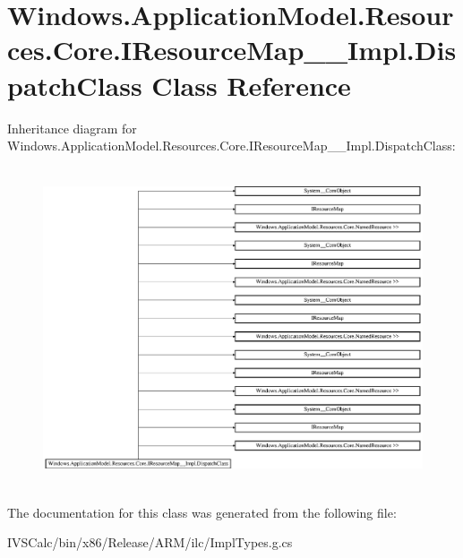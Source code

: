 \hypertarget{class_windows_1_1_application_model_1_1_resources_1_1_core_1_1_i_resource_map_____impl_1_1_dispatch_class}{}\section{Windows.\+Application\+Model.\+Resources.\+Core.\+I\+Resource\+Map\+\_\+\+\_\+\+Impl.\+Dispatch\+Class Class Reference}
\label{class_windows_1_1_application_model_1_1_resources_1_1_core_1_1_i_resource_map_____impl_1_1_dispatch_class}
Inheritance diagram for Windows.\+Application\+Model.\+Resources.\+Core.\+I\+Resource\+Map\+\_\+\+\_\+\+Impl.\+Dispatch\+Class\+:\begin{figure}[H]
\begin{center}
\leavevmode
\includegraphics[height=9.451477cm]{class_windows_1_1_application_model_1_1_resources_1_1_core_1_1_i_resource_map_____impl_1_1_dispatch_class}
\end{center}
\end{figure}


The documentation for this class was generated from the following file\+:\begin{DoxyCompactItemize}
\item 
I\+V\+S\+Calc/bin/x86/\+Release/\+A\+R\+M/ilc/Impl\+Types.\+g.\+cs\end{DoxyCompactItemize}
